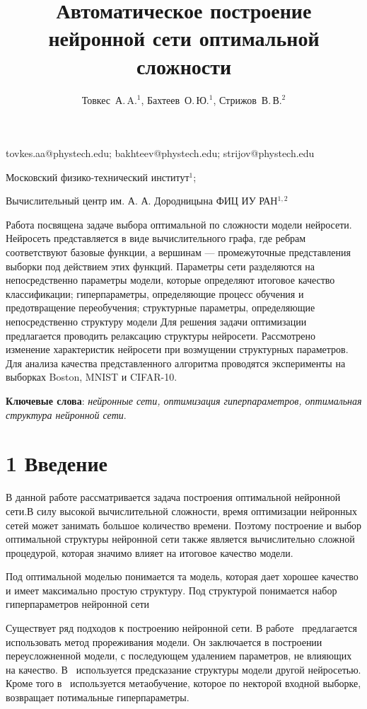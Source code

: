 \documentclass[12pt,twoside]{article}
\begin{document}
\title
    {Автоматическое построение нейронной сети оптимальной сложности}
\author
    {Товкес~А.\,A.$^1$, Бахтеев~О.\,Ю.$^1$, Стрижов~В.\,В.$^2$} %
\email
    {tovkes.aa@phystech.edu;  bakhteev@phystech.edu;  strijov@phystech.edu}
\organization
    {Московский физико-технический институт$^1$;
    	
    Вычислительный центр им. А. А. Дородницына ФИЦ ИУ РАН$^{1, 2}$}
\abstract
	{Работа посвящена задаче выбора оптимальной по сложности модели нейросети. Нейросеть представляется в виде вычислительного графа, где ребрам соответствуют базовые функции, а вершинам --- промежуточные представления выборки под действием этих функций. Параметры сети разделяются на непосредственно параметры модели, которые определяют итоговое качество классификации; гиперпараметры, определяющие процесс обучения и предотвращение переобучения; структурные параметры, определяющие непосредственно структуру модели 
    Для решения задачи оптимизации предлагается проводить релаксацию структуры нейросети. Рассмотрено изменение характеристик нейросети при возмущении структурных параметров. Для анализа качества представленного алгоритма проводятся эксперименты на выборках Boston, MNIST и CIFAR-10.

	

\bigskip
\textbf{Ключевые слова}: \emph {нейронные сети, оптимизация гиперпараметров, оптимальная структура нейронной сети}.

}
\maketitle

\section{1 Введение}
В данной работе рассматривается задача построения оптимальной нейронной сети.В силу высокой вычислительной сложности, время оптимизации нейронных сетей может занимать большое количество времени. Поэтому построение и выбор оптимальной структуры нейронной сети также является вычислительно сложной процедурой, которая значимо влияет на итоговое качество модели.

Под оптимальной моделью понимается та модель, которая дает хорошее качество и имеет максимально простую структуру. Под структурой понимается набор гиперпараметров нейронной сети

Существует ряд подходов к построению нейронной сети. В работе~\cite{BrainDamage} предлагается использовать метод прореживания модели. Он заключается в построении переусложненной модели, с последующем удалением параметров, не влияющих на качество. В~\cite{EASNT} используется предсказание структуры модели другой нейросетью. Кроме того в~\cite{GO} используется метаобучение, которое по некторой входной выборке, возвращает потимальные гиперпараметры.
\end{document}
